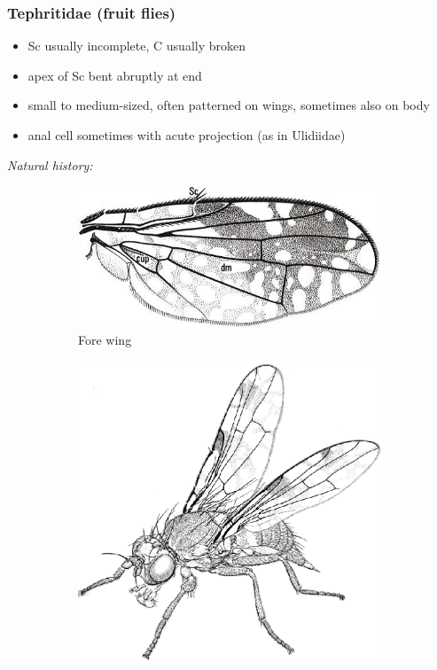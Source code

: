 \documentclass[letterpaper, 11pt]{article}
\begin{document}
\subsubsection{Tephritidae (fruit flies)}
\begin{itemize}
\item Sc usually incomplete, C usually broken
\item apex of Sc bent abruptly at end 
\item small to medium-sized, often patterned on wings, sometimes also on body
\item anal cell sometimes with acute projection (as in Ulidiidae)
\end{itemize}

\noindent{}\textit{Natural history:} \\

\begin{figure}[ht!]
    \centering
    \begin{subfigure}[ht!]{0.45\textwidth}
        \includegraphics[width=\textwidth]{TephritidWing}
        \caption{Fore wing \citep[][Fig. 4.56]{mcalpine1981manual}}
        \label{fig:tephritid1}
    \end{subfigure}
    \qquad
    \begin{subfigure}[ht!]{0.4\textwidth}
        \includegraphics[width=\textwidth]{TephritidHabitus}

\end{subfigure}
\end{figure}
\end{document}
